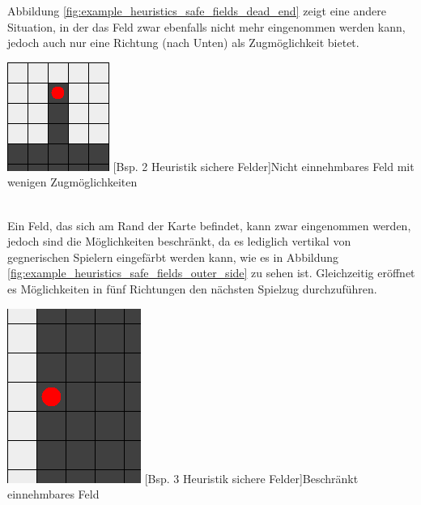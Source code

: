 \documentclass[12pt,a4paper,bibliography=totocnumbered,listof=totocnumbered]{article}
\begin{document}
Abbildung \ref{fig:example_heuristics_safe_fields_dead_end} zeigt eine andere Situation, in der das Feld zwar ebenfalls nicht mehr eingenommen werden kann, jedoch auch nur eine Richtung (nach Unten) als Zugmöglichkeit bietet.

\vspace{1em}
\begin{minipage}{\linewidth}
	\centering
	\includegraphics[width=0.3\linewidth]{pics/heuristics_safe_fields_dead_end.png}
	[Bsp. 2 Heuristik sichere Felder]{Nicht einnehmbares Feld mit wenigen Zugmöglichkeiten}
	\label{fig:example_heuristics_safe_fields_dead_end}
\end{minipage}
\\

Ein Feld, das sich am Rand der Karte befindet, kann zwar eingenommen werden, jedoch sind die Möglichkeiten beschränkt, da es lediglich vertikal von gegnerischen Spielern eingefärbt werden kann, wie es in Abbildung \ref{fig:example_heuristics_safe_fields_outer_side} zu sehen ist. Gleichzeitig eröffnet es Möglichkeiten in fünf Richtungen den nächsten Spielzug durchzuführen.

\vspace{1em}
\begin{minipage}{\linewidth}
	\centering
	\includegraphics[width=0.3\linewidth]{pics/heuristics_safe_fields_outer_side.png}
	[Bsp. 3 Heuristik sichere Felder]{Beschränkt einnehmbares Feld}
	\label{fig:example_heuristics_safe_fields_outer_side}
\end{minipage}
\\
\end{document}
